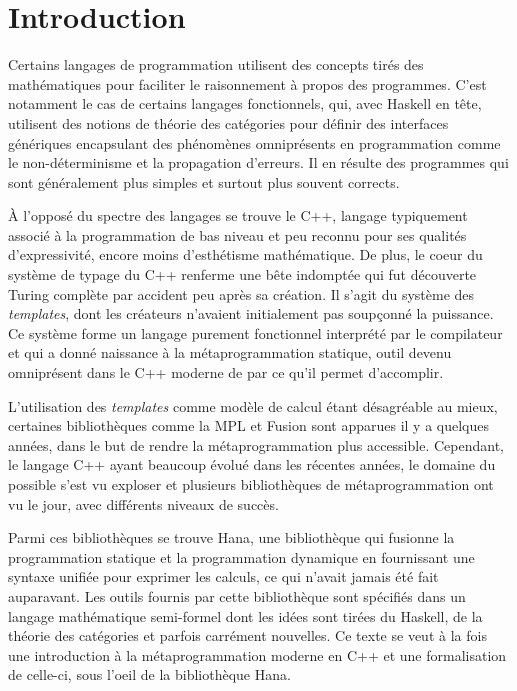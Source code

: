 \section{Introduction}
Certains langages de programmation utilisent des concepts tirés des
mathématiques pour faciliter le raisonnement à propos des programmes.
C'est notamment le cas de certains langages fonctionnels, qui, avec
Haskell en tête, utilisent des notions de théorie des catégories pour
définir des interfaces génériques encapsulant des phénomènes omniprésents
en programmation comme le non-déterminisme et la propagation d'erreurs.
Il en résulte des programmes qui sont généralement plus simples et surtout
plus souvent corrects.

À l'opposé du spectre des langages se trouve le C++, langage typiquement
associé à la programmation de bas niveau et peu reconnu pour ses qualités
d'expressivité, encore moins d'esthétisme mathématique. De plus, le coeur
du système de typage du C++ renferme une bête indomptée qui fut découverte
Turing complète par accident peu après sa création. Il s'agit du système des
\textit{templates}, dont les créateurs n'avaient initialement pas soupçonné
la puissance. Ce système forme un langage purement fonctionnel interprété par
le compilateur et qui a donné naissance à la métaprogrammation statique, outil
devenu omniprésent dans le C++ moderne de par ce qu'il permet d'accomplir.

L'utilisation des \textit{templates} comme modèle de calcul étant désagréable
au mieux, certaines bibliothèques comme la MPL et Fusion sont apparues il y a
quelques années, dans le but de rendre la métaprogrammation plus accessible.
Cependant, le langage C++ ayant beaucoup évolué dans les récentes années, le
domaine du possible s'est vu exploser et plusieurs bibliothèques de
métaprogrammation ont vu le jour, avec différents niveaux de succès.

Parmi ces bibliothèques se trouve Hana, une bibliothèque qui fusionne la
programmation statique et la programmation dynamique en fournissant une
syntaxe unifiée pour exprimer les calculs, ce qui n'avait jamais été fait
auparavant. Les outils fournis par cette bibliothèque sont spécifiés dans
un langage mathématique semi-formel dont les idées sont tirées du Haskell,
de la théorie des catégories et parfois carrément nouvelles. Ce texte se
veut à la fois une introduction à la métaprogrammation moderne en C++ et
une formalisation de celle-ci, sous l'oeil de la bibliothèque Hana.
